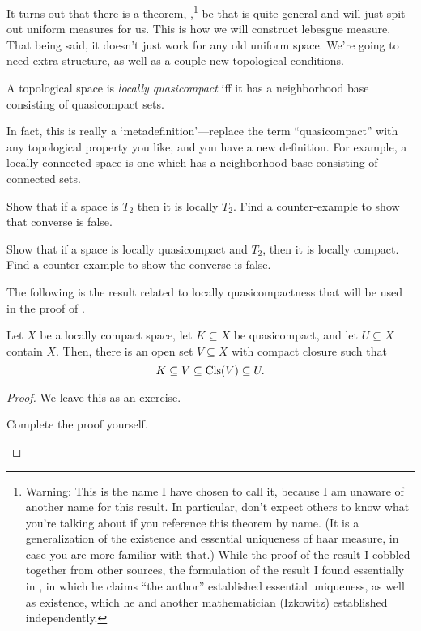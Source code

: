 It turns out that there is a theorem, ,\footnote{Warning:  This is the name I have chosen to call it, because I am unaware of another name for this result.  In particular, don't expect others to know what you're talking about if you reference this theorem by name.  (It is a generalization of the existence and essential uniqueness of haar measure, in case you are more familiar with that.)  While the proof of the result I cobbled together from other sources, the formulation of the result I found essentially in \cite{Howes}, in which he claims ``the author'' established essential uniqueness, as well as existence, which he and another mathematician (Izkowitz) established independently.}  be that is quite general and will just spit out uniform measures for us.  This is how we will construct lebesgue measure.  That being said, it doesn't just work for any old uniform space.  We're going to need extra structure, as well as a couple new topological conditions.
\begin{dfn}\label{LocallyQuasicompact}
A topological space is \emph{locally quasicompact} iff it has a neighborhood base consisting of quasicompact sets.
\begin{rmk}
In fact, this is really a `metadefinition'---replace the term ``quasicompact'' with any topological property you like, and you have a new definition.  For example, a locally connected space is one which has a neighborhood base consisting of connected sets.
\end{rmk}
\end{dfn}
\begin{exr}
Show that if a space is $T_2$ then it is locally $T_2$.  Find a counter-example to show that converse is false.
\end{exr}
\begin{exr}
Show that if a space is locally quasicompact and $T_2$, then it is locally compact.  Find a counter-example to show the converse is false.
\end{exr}
The following is the result related to locally quasicompactness that will be used in the proof of .
\begin{prp}\label{prp5.2.4}
Let $X$ be a locally compact space, let $K\subseteq X$ be quasicompact, and let $U\subseteq X$ contain $X$.  Then, there is an open set $V\subseteq X$ with compact closure such that
\begin{equation}
K\subseteq V\subseteq \operatorname{Cls} (V)\subseteq U.
\end{equation}
\begin{proof}
We leave this as an exercise.
\begin{exr}
Complete the proof yourself.
\end{exr}
\end{proof}
\end{prp}
